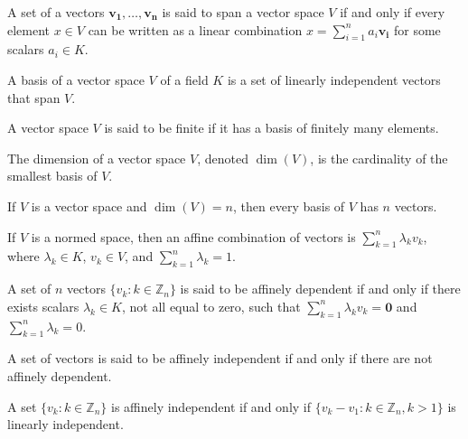 \documentclass[crop=false,class=book,oneside]{standalone}
\begin{document}
            \begin{definition}
            A set of a vectors $\mathbf{v_1},\hdots, \mathbf{v_n}$ is said to span a vector space $V$ if and only if every element $x\in V$ can be written as a linear combination $x=\sum_{i=1}^{n} a_i \mathbf{v_i}$ for some scalars $a_i \in K$.
            \end{definition}
            \begin{definition}
            A basis of a vector space $V$ of a field $K$ is a set of linearly independent vectors that span $V$.
            \end{definition}
            \begin{definition}
            A vector space $V$ is said to be finite if it has a basis of finitely many elements.
            \end{definition}
            \begin{definition}
            The dimension of a vector space $V$, denoted $\dim(V)$, is the cardinality of the smallest basis of $V$.
            \end{definition}
            \begin{theorem}
            If $V$ is a vector space and $\dim(V)=n$, then every basis of $V$ has $n$ vectors.
            \end{theorem}
            \begin{definition}
            If $V$ is a normed space, then an affine combination of vectors is $\sum_{k=1}^{n} \lambda_k v_k$, where $\lambda_k \in K$, $v_k \in V$, and $\sum_{k=1}^{n} \lambda_k = 1$.
            \end{definition}
            \begin{definition}
            A set of $n$ vectors $\{v_k:k\in \mathbb{Z}_n\}$ is said to be affinely dependent if and only if there exists scalars $\lambda_k \in K$, not all equal to zero, such that $\sum_{k=1}^{n} \lambda_k v_k = \mathbf{0}$ and $\sum_{k=1}^{n} \lambda_k = 0$.
            \end{definition}
            \begin{definition}
            A set of vectors is said to be affinely independent if and only if there are not affinely dependent.
            \end{definition}
            \begin{theorem}
            A set $\{v_k:k\in \mathbb{Z}_n\}$ is affinely independent if and only if $\{v_k-v_1:k\in \mathbb{Z}_n, k>1\}$ is linearly independent.
            \end{theorem}
\end{document}
